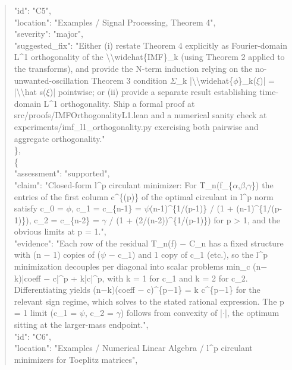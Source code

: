 \documentclass[11pt]{article}
\begin{document}
\begin{quote}
      "id": "C5",\\
      "location": "Examples / Signal Processing, Theorem 4",\\
      "severity": "major",\\
      "suggested\_fix": "Either (i) restate Theorem 4 explicitly as Fourier-domain L\^{}1 orthogonality of the \textbackslash{}\textbackslash{}widehat\{IMF\}\_k (using Theorem 2 applied to the transforms), and provide the N-term induction relying on the no-unwanted-oscillation Theorem 3 condition \ensuremath{\Sigma}\_k |\textbackslash{}\textbackslash{}widehat\{\ensuremath{\phi}\}\_k(\ensuremath{\xi})| = |\textbackslash{}\textbackslash{}hat s(\ensuremath{\xi})| pointwise; or (ii) provide a separate result establishing time-domain L\^{}1 orthogonality. Ship a formal proof at src/proofs/IMFOrthogonalityL1.lean and a numerical sanity check at experiments/imf\_l1\_orthogonality.py exercising both pairwise and aggregate orthogonality."\\
    \},\\
    \{\\
      "assessment": "supported",\\
      "claim": "Closed-form l\^{}p circulant minimizer: For T\_n(f\_\{\ensuremath{\alpha},\ensuremath{\beta},\ensuremath{\gamma}\}) the entries of the first column c\^{}\{(p)\} of the optimal circulant in l\^{}p norm satisfy c\_0 = \ensuremath{\phi}, c\_1 = c\_\{n-1\} = \ensuremath{\psi}(n-1)\^{}\{1/(p-1)\} / (1 + (n-1)\^{}\{1/(p-1)\}), c\_2 = c\_\{n-2\} = \ensuremath{\gamma} / (1 + (2/(n-2))\^{}\{1/(p-1)\}) for p > 1, and the obvious limits at p = 1.",\\
      "evidence": "Each row of the residual T\_n(f) \ensuremath{-} C\_n has a fixed structure with (n \ensuremath{-} 1) copies of (\ensuremath{\psi} \ensuremath{-} c\_1) and 1 copy of c\_1 (etc.), so the l\^{}p minimization decouples per diagonal into scalar problems min\_c (n\ensuremath{-}k)|coeff \ensuremath{-} c|\^{}p + k|c|\^{}p, with k = 1 for c\_1 and k = 2 for c\_2. Differentiating yields (n\ensuremath{-}k)(coeff \ensuremath{-} c)\^{}\{p\ensuremath{-}1\} = k c\^{}\{p\ensuremath{-}1\} for the relevant sign regime, which solves to the stated rational expression. The p = 1 limit (c\_1 = \ensuremath{\psi}, c\_2 = \ensuremath{\gamma}) follows from convexity of |\ensuremath{\cdot}|, the optimum sitting at the larger-mass endpoint.",\\
      "id": "C6",\\
      "location": "Examples / Numerical Linear Algebra / l\^{}p circulant minimizers for Toeplitz matrices",\\

\end{quote}
\end{document}
